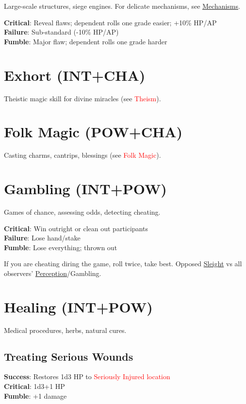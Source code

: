 \documentclass[10pt]{article}
\begin{document}
Large-scale structures, siege engines. For delicate mechanisms, see \hyperref[skill:mechanisms]{Mechanisms}.

\textbf{Critical}: Reveal flaws; dependent rolls one grade easier; +10\% HP/AP\\
\textbf{Failure}: Sub-standard (-10\% HP/AP)\\
\textbf{Fumble}: Major flaw; dependent rolls one grade harder

\section{Exhort (INT+CHA)}
\label{skill:exhort}

Theistic magic skill for divine miracles (see \textcolor{red}{Theism}).

\section{Folk Magic (POW+CHA)}
\label{skill:folkmagic}

Casting charms, cantrips, blessings (see \textcolor{red}{Folk Magic}).

\section{Gambling (INT+POW)}
\label{skill:gambling}

Games of chance, assessing odds, detecting cheating.

\textbf{Critical}: Win outright or clean out participants\\
\textbf{Failure}: Lose hand/stake\\
\textbf{Fumble}: Lose everything; thrown out

If you are cheating diring the game, roll twice, take best. Opposed \hyperref[skill:sleight]{Sleight} vs all observers' \hyperref[skill:perception]{Perception}/Gambling.

\section{Healing (INT+POW)}
\label{skill:healing}

Medical procedures, herbs, natural cures.

\subsection{Treating Serious Wounds}
\textbf{Success}: Restores 1d3 HP to \textcolor{red}{Seriously Injured location}\\
\textbf{Critical}: 1d3+1 HP\\
\textbf{Fumble}: +1 damage
\end{document}
